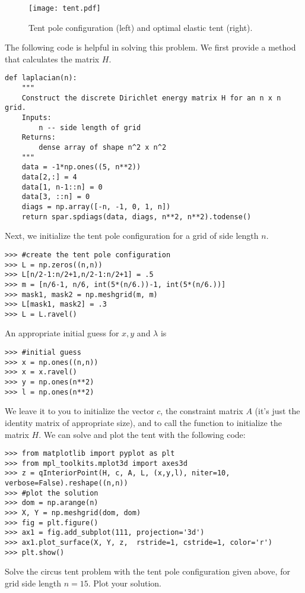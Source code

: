\begin{figure}
\texttt{[image: tent.pdf]}
\caption{Tent pole configuration (left) and optimal elastic tent (right).}
\label{fig:tent}
\end{figure}

The following code is helpful in solving this problem. We first provide a method that calculates the matrix $H$.
\begin{lstlisting}
def laplacian(n):
    """
    Construct the discrete Dirichlet energy matrix H for an n x n grid.
    Inputs:
        n -- side length of grid
    Returns:
        dense array of shape n^2 x n^2
    """
    data = -1*np.ones((5, n**2))
    data[2,:] = 4
    data[1, n-1::n] = 0
    data[3, ::n] = 0
    diags = np.array([-n, -1, 0, 1, n])
    return spar.spdiags(data, diags, n**2, n**2).todense()
\end{lstlisting}
Next, we initialize the tent pole configuration for a grid of side length $n$.
\begin{lstlisting}
>>> #create the tent pole configuration
>>> L = np.zeros((n,n))
>>> L[n/2-1:n/2+1,n/2-1:n/2+1] = .5
>>> m = [n/6-1, n/6, int(5*(n/6.))-1, int(5*(n/6.))]
>>> mask1, mask2 = np.meshgrid(m, m)
>>> L[mask1, mask2] = .3
>>> L = L.ravel()
\end{lstlisting}
An appropriate initial guess for $x, y$ and $\lambda$ is
\begin{lstlisting}
>>> #initial guess
>>> x = np.ones((n,n))
>>> x = x.ravel()
>>> y = np.ones(n**2)
>>> l = np.ones(n**2)
\end{lstlisting}
We leave it to you to initialize the vector $c$, the constraint matrix $A$ (it's just the identity matrix of
appropriate size), and to call the function  to initialize the matrix $H$.
We can solve and plot the tent with the following code:
\begin{lstlisting}
>>> from matplotlib import pyplot as plt
>>> from mpl_toolkits.mplot3d import axes3d
>>> z = qInteriorPoint(H, c, A, L, (x,y,l), niter=10, verbose=False).reshape((n,n))
>>> #plot the solution
>>> dom = np.arange(n)
>>> X, Y = np.meshgrid(dom, dom)
>>> fig = plt.figure()
>>> ax1 = fig.add_subplot(111, projection='3d')
>>> ax1.plot_surface(X, Y, z,  rstride=1, cstride=1, color='r')
>>> plt.show()
\end{lstlisting}

\begin{problem}
Solve the circus tent problem with the tent pole configuration given above, for grid side length $n = 15$.
Plot your solution.
\end{problem}

